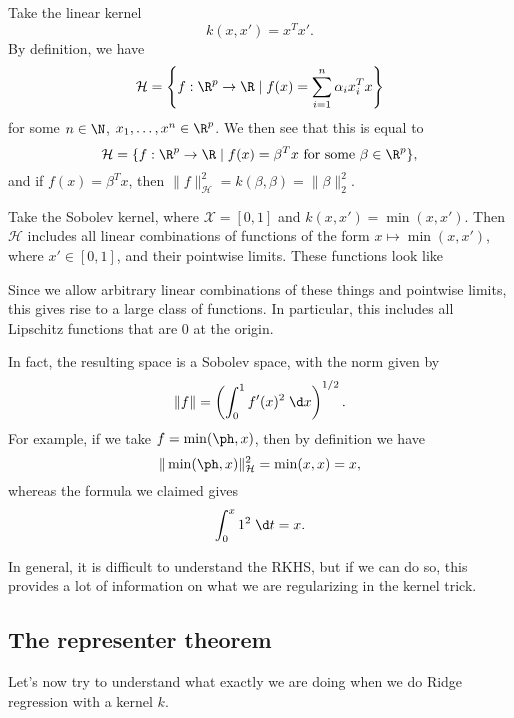 \documentclass[a4paper]{article}
\begin{document}
\begin{eg}
  Take the linear kernel
  \[
    k(x, x') = x^T x'.
  \]
  By definition, we have
  \[
    \mathcal{H} = \left\{f:\R^p \to \R \mid f(x) = \sum_{i = 1}^n \alpha_i x_i^T x\right\}
  \]
  for some $n \in \N$, $x_1, \ldots, x^n \in \R^p$. We then see that this is equal to
  \[
    \mathcal{H} = \{f: \R^p \to \R \mid f(x) = \beta^T x\text{ for some }\beta \in \R^p\},
  \]
  and if $f(x) = \beta^T x$, then $\|f\|_{\mathcal{H}}^2 = k(\beta, \beta) = \|\beta\|^2_2$.
\end{eg}

\begin{eg}
  Take the Sobolev kernel, where $\mathcal{X} = [0, 1]$ and $k(x, x') = \min(x, x')$. Then $\mathcal{H}$ includes all linear combinations of functions of the form $x \mapsto \min(x, x')$, where $x' \in [0, 1]$, and their pointwise limits. These functions look like
  \begin{center}
  \end{center}
  Since we allow arbitrary linear combinations of these things and pointwise limits, this gives rise to a large class of functions. In particular, this includes all Lipschitz functions that are $0$ at the origin.

  In fact, the resulting space is a Sobolev space, with the norm given by%
  \[
    \|f\| = \left(\int_0^1 f'(x)^2 \;\d x \right)^{1/2}.
  \]
  For example, if we take $f = \min (\ph, x)$, then by definition we have
  \[
    \|\min(\ph, x)\|_\mathcal{H}^2 = \min(x, x) = x,
  \]
  whereas the formula we claimed gives
  \[
    \int_0^x 1^2 \;\d t = x.
  \]
\end{eg}

In general, it is difficult to understand the RKHS, but if we can do so, this provides a lot of information on what we are regularizing in the kernel trick.

\subsection{The representer theorem}
Let's now try to understand what exactly we are doing when we do Ridge regression with a kernel $k$.
\end{document}
